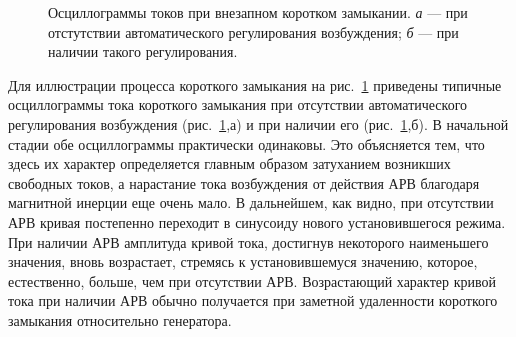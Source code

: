 \begin{figure}
	\begin{minipage}[h]{1\linewidth}
	\end{minipage}
	\vfill
	\begin{minipage}[h]{1\linewidth}
	\end{minipage}
	\caption{Осциллограммы токов при внезапном коротком замыкании. \textit{а} --- при отстутствии автоматического регулирования возбуждения; \textit{б} --- при наличии такого регулирования.}
	\label{ris:1-2 toki_kz_bez_arv_i_s_nim}
\end{figure}

Для иллюстрации процесса короткого замыкания на рис.~\ref{ris:1-2 toki_kz_bez_arv_i_s_nim} приведены типичные осциллограммы тока короткого замыкания при отсутствии автоматического регулирования возбуждения (рис.~\ref{ris:1-2 toki_kz_bez_arv_i_s_nim},а) и при наличии его (рис.~\ref{ris:1-2 toki_kz_bez_arv_i_s_nim},б). В начальной стадии обе осциллограммы практически одинаковы. Это объясняется тем, что здесь их характер определяется главным образом затуханием возникших свободных токов, а нарастание тока возбуждения от действия АРВ благодаря магнитной инерции еще очень мало. В дальнейшем, как видно, при отсутствии АРВ кривая постепенно переходит в синусоиду нового установившегося режима. При наличии АРВ амплитуда кривой тока, достигнув некоторого наименьшего значения, вновь возрастает, стремясь к установившемуся значению, которое, естественно, больше, чем при отсутствии АРВ. Возрастающий характер кривой тока при наличии АРВ обычно получается при заметной удаленности короткого замыкания относительно генератора.

